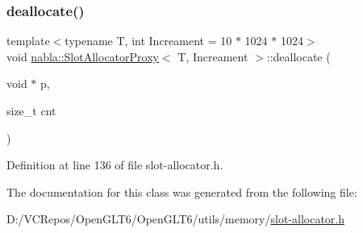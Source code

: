\mbox{\label{classnabla_1_1_slot_allocator_proxy_aea1e0a1bb27b9ca2130979566a4b4021}} 
\subsubsection{\texorpdfstring{deallocate()}{deallocate()}}
{\footnotesize\ttfamily template$<$typename T, int Increament = 10 $\ast$ 1024 $\ast$ 1024$>$ \\
void \mbox{\hyperlink{classnabla_1_1_slot_allocator_proxy}{nabla\+::\+Slot\+Allocator\+Proxy}}$<$ T, Increament $>$\+::deallocate (\begin{DoxyParamCaption}\item[{void $\ast$}]{p,  }\item[{size\+\_\+t}]{cnt }\end{DoxyParamCaption})\hspace{0.3cm}{\ttfamily [inline]}}



Definition at line 136 of file slot-\/allocator.\+h.



The documentation for this class was generated from the following file\+:\begin{DoxyCompactItemize}
\item 
D\+:/\+V\+C\+Repos/\+Open\+G\+L\+T6/\+Open\+G\+L\+T6/utils/memory/\mbox{\hyperlink{slot-allocator_8h}{slot-\/allocator.\+h}}\end{DoxyCompactItemize}

